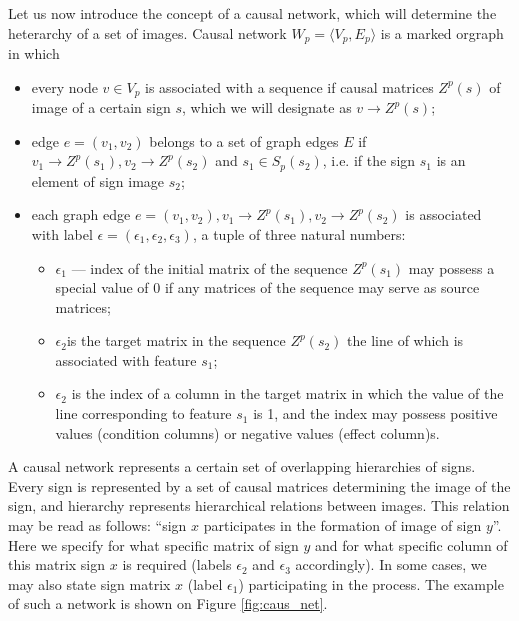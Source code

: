 \documentclass[review]{elsarticle}
\begin{document}
Let us now introduce the concept of a causal network, which will determine the heterarchy of a set of images. Causal network $W_p=\langle V_p, E_p \rangle$ is a marked orgraph in which
\begin{itemize}
	\item every node $v\in V_p$ is associated with a sequence if causal matrices $Z^p(s)$ of image of a certain sign $s$, which we will designate as $v\rightarrow Z^p(s)$;
	\item edge $e=(v_1, v_2)$ belongs to a set of graph edges $E$ if $v_1\rightarrow Z^p(s_1), v_2\rightarrow Z^p(s_2)$ and $s_1\in S_p(s_2)$, i.e. if the sign $s_1$ is an element of sign image $s_2$;
	\item each graph edge $e=(v_1, v_2), v_1\rightarrow Z^p(s_1), v_2\rightarrow Z^p(s_2)$ is associated with label $\epsilon=(\epsilon_1,\epsilon_2,\epsilon_3)$, a tuple of three natural numbers:
	\begin{itemize}
		\item $\epsilon_1$ --- index of the initial matrix of the sequence $Z^p(s_1)$ may possess a special value of 0 if any matrices of the sequence may serve as source matrices;
		\item $\epsilon_2$is the target matrix in the sequence $Z^p(s_2)$ the line of which is associated with feature $s_1$;
		\item $\epsilon_2$ is the index of a column in the target matrix in which the value of the line corresponding to feature $s_1$ is 1, and the index may possess positive values (condition columns) or negative values (effect column)s.
	\end{itemize}		
\end{itemize}

A causal network represents a certain set of overlapping hierarchies of signs. Every sign is represented by a set of causal matrices determining the image of the sign, and hierarchy represents hierarchical relations between images. This relation may be read as follows: ``sign $x$ participates in the formation of image of sign $y$''. Here we specify for what specific matrix of sign $y$ and for what specific column of this matrix sign $x$ is required (labels $\epsilon_2$ and $\epsilon_3$ accordingly). In some cases, we may also state sign matrix $x$ (label $\epsilon_1$) participating in the process. The example of such a network is shown on Figure \ref{fig:caus_net}.
\end{document}
